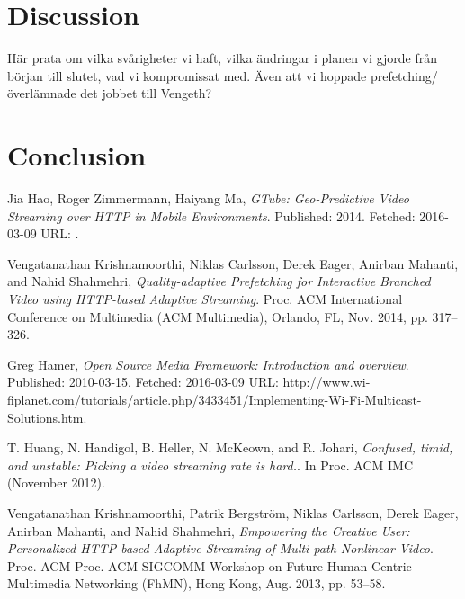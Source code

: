 \documentclass[9pt,a4paper]{acmproc}
\begin{document}
\section{Discussion}
Här prata om vilka svårigheter vi haft, vilka ändringar i planen vi gjorde från början till slutet, vad vi kompromissat med. Även att vi hoppade prefetching/överlämnade det jobbet till Vengeth?

\section{Conclusion}


\clearpage
\begin{thebibliography}{9}

  Jia Hao, Roger Zimmermann, Haiyang Ma,
  \emph{GTube: Geo-Predictive Video Streaming over HTTP in Mobile Environments}.
  \newline
  Published: 2014. Fetched: 2016-03-09 
  \newline
	URL: .

  Vengatanathan Krishnamoorthi, Niklas Carlsson, Derek Eager, Anirban 
Mahanti, and Nahid Shahmehri,
  \emph{Quality-adaptive Prefetching for Interactive 
Branched Video using HTTP-based Adaptive Streaming}.
  \newline
  Proc. ACM 
International Conference on Multimedia (ACM Multimedia), Orlando, FL, Nov. 2014, pp. 317--326.

  Greg Hamer,
  \emph{Open Source Media Framework: Introduction and overview}.
  \newline
  Published: 2010-03-15. Fetched: 2016-03-09
 \newline
  URL: http://www.wi-fiplanet.com/tutorials/article.php/3433451/Implementing-Wi-Fi-Multicast-Solutions.htm.
  
  T. Huang, N. Handigol, B. Heller, N. McKeown, and R. Johari,
  \emph{Confused, timid, and unstable: Picking a video streaming rate is hard.}.
  \newline
  In Proc. ACM IMC (November 2012).
  
  Vengatanathan Krishnamoorthi, Patrik Bergström, Niklas Carlsson, Derek 
Eager, Anirban Mahanti, and Nahid Shahmehri,
  \emph{Empowering the Creative User: 
Personalized HTTP-based Adaptive Streaming of Multi-path Nonlinear Video}.
  \newline
  Proc. ACM 
Proc. ACM SIGCOMM Workshop on Future Human-Centric Multimedia Networking 
(FhMN), Hong Kong, Aug. 2013, pp. 53--58.


\end{thebibliography}
\end{document}

